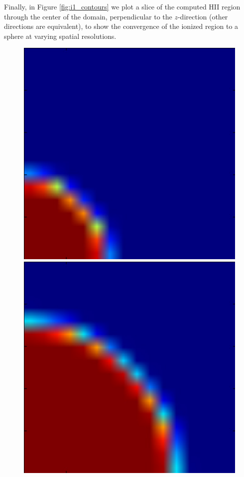 Finally, in Figure \ref{fig:i1_contours} we plot a slice of the
computed HII region through the center of the domain, perpendicular to
the $z$-direction (other directions are equivalent), to show the
convergence of the ionized region to a sphere at varying spatial
resolutions.
\begin{figure}[t]
\centerline{\hfill
  \includegraphics[scale=0.3]{i1-HIIcontour_10myr_nx16.pdf}
  \hspace{0.1cm}
  \includegraphics[scale=0.3]{i1-HIIcontour_100myr_nx16.pdf}
}
\end{figure}
